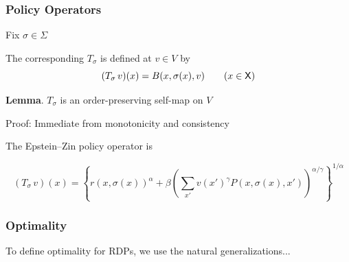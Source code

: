 \documentclass[dvipsnames]{beamer}
\begin{document}
\begin{frame}
    \frametitle{Policy Operators}

    Fix $\sigma \in \Sigma$ 

        \vspace{0.5em}
        \vspace{0.5em}
    The corresponding  $T_\sigma$ is
    defined at $v \in V$ by 
    \begin{equation*}
        (T_\sigma \, v)(x)
        = B(x, \sigma(x), v)
        \qquad (x \in \mathsf X)
    \end{equation*}


        \vspace{0.5em}
        \vspace{0.5em}
        \vspace{0.5em}
        \vspace{0.5em}

        {\bf Lemma}.  $T_\sigma$ is an order-preserving self-map on $V$ 


        \vspace{0.5em}
        Proof: Immediate from monotonicity and consistency

\end{frame}


\begin{frame}
    

    \Eg The Epstein--Zin policy operator is 

    \begin{equation*}
    (T_\sigma \, v)(x) 
    =
        \left\{
            r(x, \sigma(x))^\alpha + \beta 
                \left(
                    \sum_{x'} v(x')^\gamma P(x,\sigma(x), x')
                \right)^{\alpha / \gamma}
        \right\}^{1/\alpha}
    \end{equation*}

\end{frame}

\begin{frame}
    \frametitle{Optimality}
    
    To define optimality for RDPs, we use the natural generalizations...

\end{frame}
\end{document}
